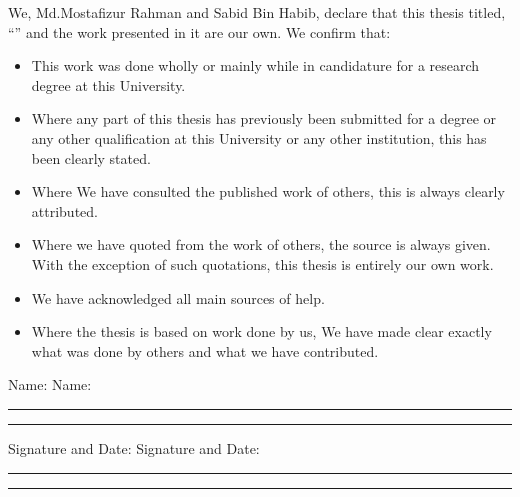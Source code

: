 \documentclass[
12pt, %
oneside, %
english, %
doublespacing, %
headsepline, %
]{MastersDoctoralThesis} %
\begin{document}

\begin{declaration}
\addchaptertocentry{\authorshipname}

\noindent We, Md.Mostafizur Rahman and Sabid Bin Habib, declare that this thesis titled, \enquote{\ttitle} and the work presented in it are our own. We confirm that:

\begin{itemize} 
\item This work was done wholly or mainly while in candidature for a research degree at this University.
\item Where any part of this thesis has previously been submitted for a degree or any other qualification at this University or any other institution, this has been clearly stated.
\item Where We have consulted the published work of others, this is always clearly attributed.
\item Where we have quoted from the work of others, the source is always given. With the exception of such quotations, this thesis is entirely our own work.
\item We have acknowledged all main sources of help.
\item Where the thesis is based on work done by us, We have made clear exactly what was done by others and what we have contributed.\\
\end{itemize}
 
\noindent Name:  \hspace{18em} Name: \\
\rule[0.5em]{10em}{0.5pt} \hspace{11em} \rule[0.5em]{10em}{0.5pt}%

\noindent Signature and Date: \hspace{12em} Signature and Date:\\
\rule[0.5em]{10em}{0.5pt} \hspace{11em} \rule[0.5em]{10em}{0.5pt}%
\end{declaration}

\end{document}
